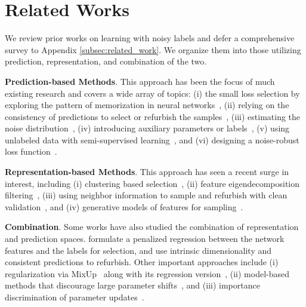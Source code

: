 \section{Related Works}
\label{sec:related_works}
\vskip -0.05in
We review prior works on learning with noisy labels and defer a comprehensive survey to Appendix \ref{subsec:related_work}. %
We organize them into those utilizing prediction, representation, and combination of the two.

\textbf{Prediction-based Methods}.
This approach has been the focus of much existing research and covers a wide array of topics: (i) 
the small loss selection by exploring the pattern of memorization in neural networks~\citep{han18coteaching, arazo19}, 
(ii) relying on the consistency of predictions to select or refurbish the samples~\citep{liu2020early,huang2020self},
(iii) estimating the noise distribution~\citep{patrini17,hendrycks18nips},
(iv) introducing auxiliary parameters or labels~\citep{pleiss20aum,hu20rdiaux},
(v) using unlabeled data with semi-supervised learning~\citep{li2020dividemix,bai2021understanding,karim2022unicon}, 
and (vi) designing a noise-robust loss function~\citep{menon20phuber,wang19sce}.

\textbf{Representation-based Methods}.
This approach has seen a recent surge in interest, including
(i) clustering based selection~\citep{mirzasoleiman20crust,wu20topo},
(ii) feature eigendecomposition filtering~\citep{kim21fine}, %
(iii) using neighbor information to sample and refurbish with clean validation~\citep{li22neighbor, gao16knn},
and (iv) generative models of features for sampling~\citep{kmlee19}.

\textbf{Combination}.
Some works have also studied the combination of representation and prediction spaces.
\citet{wang22spr} formulate a penalized regression between the network features and the labels for selection,
and \citet{ma18d2l} use intrinsic dimensionality and consistent predictions to refurbish.
Other important approaches include (i) regularization via MixUp~\citep{zhang18mixup} along with its regression version~\citep{yao22cmixup},
(ii) model-based methods that discourage large parameter shifts~\citep{hu20rdiaux}, and (iii) importance discrimination of parameter updates~\citep{xia21cdr}.

